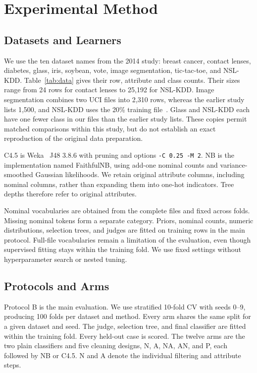 \documentclass[conference,a4paper]{IEEEtran}
\begin{document}
\section{Experimental Method}
\subsection{Datasets and Learners}
We use the ten dataset names from the 2014 study: breast cancer, contact lenses, diabetes, glass, iris, soybean, vote, image segmentation, tic-tac-toe, and NSL-KDD. Table~\ref{tab:data} gives their row, attribute and class counts. Their sizes range from 24 rows for contact lenses to 25,192 for NSL-KDD. Image segmentation combines two UCI files into 2,310 rows, whereas the earlier study lists 1,500, and NSL-KDD uses the 20\% training file~\cite{tavallaee2009detailed}. Glass and NSL-KDD each have one fewer class in our files than the earlier study lists. These copies permit matched comparisons within this study, but do not establish an exact reproduction of the original data preparation.

\begin{table}[t]
\caption{Files used in this study. Attributes are original columns; the final column is the smallest class size.}
\label{tab:data}
\centering\footnotesize
\setlength{\tabcolsep}{4pt}

\end{table}

C4.5 is Weka~\cite{witten2016weka} J48 3.8.6 with pruning and options \texttt{-C 0.25 -M 2}. NB is the implementation named FaithfulNB, using add-one nominal counts and variance-smoothed Gaussian likelihoods. We retain original attribute columns, including nominal columns, rather than expanding them into one-hot indicators. Tree depths therefore refer to original attributes.

Nominal vocabularies are obtained from the complete files and fixed across folds. Missing nominal tokens form a separate category. Priors, nominal counts, numeric distributions, selection trees, and judges are fitted on training rows in the main protocol. Full-file vocabularies remain a limitation of the evaluation, even though supervised fitting stays within the training fold. We use fixed settings without hyperparameter search or nested tuning.

\subsection{Protocols and Arms}
Protocol B is the main evaluation. We use stratified 10-fold CV with seeds 0--9, producing 100 folds per dataset and method. Every arm shares the same split for a given dataset and seed. The judge, selection tree, and final classifier are fitted within the training fold. Every held-out case is scored. The twelve arms are the two plain classifiers and five cleaning designs, N, A, NA, AN, and P, each followed by NB or C4.5. N and A denote the individual filtering and attribute steps.
\end{document}
